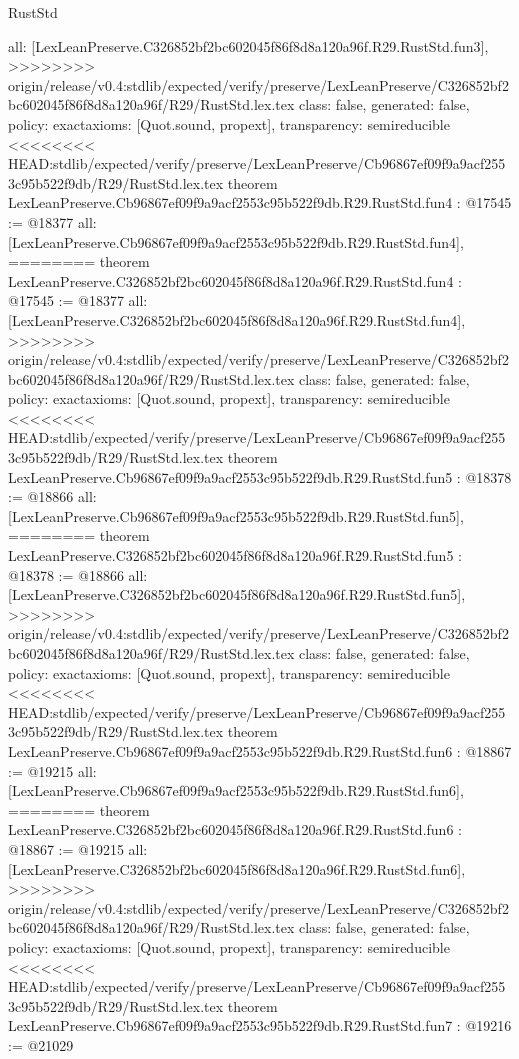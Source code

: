 \begin{lexlean}{RustStd}
\begin{coremodule}
{\begin{coremodule}
{{{{{{{  all: [LexLeanPreserve.C326852bf2bc602045f86f8d8a120a96f.R29.RustStd.fun3],
>>>>>>>> origin/release/v0.4:stdlib/expected/verify/preserve/LexLeanPreserve/C326852bf2bc602045f86f8d8a120a96f/R29/RustStd.lex.tex
  class: false,
  generated: false,
  policy: exact{axioms: [Quot.sound, propext]},
  transparency: semireducible
}
<<<<<<<< HEAD:stdlib/expected/verify/preserve/LexLeanPreserve/Cb96867ef09f9a9acf2553c95b522f9db/R29/RustStd.lex.tex
theorem LexLeanPreserve.Cb96867ef09f9a9acf2553c95b522f9db.R29.RustStd.fun4 : @17545 := @18377 {
  all: [LexLeanPreserve.Cb96867ef09f9a9acf2553c95b522f9db.R29.RustStd.fun4],
========
theorem LexLeanPreserve.C326852bf2bc602045f86f8d8a120a96f.R29.RustStd.fun4 : @17545 := @18377 {
  all: [LexLeanPreserve.C326852bf2bc602045f86f8d8a120a96f.R29.RustStd.fun4],
>>>>>>>> origin/release/v0.4:stdlib/expected/verify/preserve/LexLeanPreserve/C326852bf2bc602045f86f8d8a120a96f/R29/RustStd.lex.tex
  class: false,
  generated: false,
  policy: exact{axioms: [Quot.sound, propext]},
  transparency: semireducible
}
<<<<<<<< HEAD:stdlib/expected/verify/preserve/LexLeanPreserve/Cb96867ef09f9a9acf2553c95b522f9db/R29/RustStd.lex.tex
theorem LexLeanPreserve.Cb96867ef09f9a9acf2553c95b522f9db.R29.RustStd.fun5 : @18378 := @18866 {
  all: [LexLeanPreserve.Cb96867ef09f9a9acf2553c95b522f9db.R29.RustStd.fun5],
========
theorem LexLeanPreserve.C326852bf2bc602045f86f8d8a120a96f.R29.RustStd.fun5 : @18378 := @18866 {
  all: [LexLeanPreserve.C326852bf2bc602045f86f8d8a120a96f.R29.RustStd.fun5],
>>>>>>>> origin/release/v0.4:stdlib/expected/verify/preserve/LexLeanPreserve/C326852bf2bc602045f86f8d8a120a96f/R29/RustStd.lex.tex
  class: false,
  generated: false,
  policy: exact{axioms: [Quot.sound, propext]},
  transparency: semireducible
}
<<<<<<<< HEAD:stdlib/expected/verify/preserve/LexLeanPreserve/Cb96867ef09f9a9acf2553c95b522f9db/R29/RustStd.lex.tex
theorem LexLeanPreserve.Cb96867ef09f9a9acf2553c95b522f9db.R29.RustStd.fun6 : @18867 := @19215 {
  all: [LexLeanPreserve.Cb96867ef09f9a9acf2553c95b522f9db.R29.RustStd.fun6],
========
theorem LexLeanPreserve.C326852bf2bc602045f86f8d8a120a96f.R29.RustStd.fun6 : @18867 := @19215 {
  all: [LexLeanPreserve.C326852bf2bc602045f86f8d8a120a96f.R29.RustStd.fun6],
>>>>>>>> origin/release/v0.4:stdlib/expected/verify/preserve/LexLeanPreserve/C326852bf2bc602045f86f8d8a120a96f/R29/RustStd.lex.tex
  class: false,
  generated: false,
  policy: exact{axioms: [Quot.sound, propext]},
  transparency: semireducible
}
<<<<<<<< HEAD:stdlib/expected/verify/preserve/LexLeanPreserve/Cb96867ef09f9a9acf2553c95b522f9db/R29/RustStd.lex.tex
theorem LexLeanPreserve.Cb96867ef09f9a9acf2553c95b522f9db.R29.RustStd.fun7 : @19216 := @21029 {
}}}}}}}}}}
\end{coremodule}}
\end{coremodule}
\end{lexlean}
